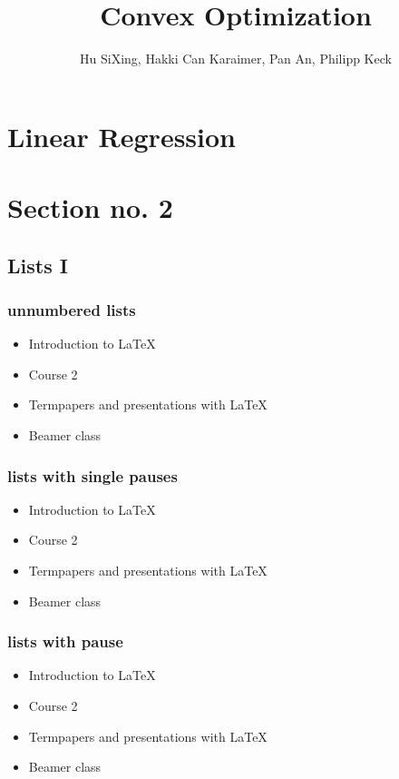 \documentclass[hyperref={pdfpagelabels=false}]{beamer}
\author[\parbox{.2\paperwidth}{}]{Hu SiXing, Hakki Can Karaimer, Pan An, Philipp Keck}
\institute{National University of Singapore}
\title{Convex Optimization}
\newcommand\mynew{andyandyandy}
\begin{document}
\begin{frame}
  \titlepage
\end{frame}


% 


\section{Linear Regression}



\section{Section no. 2}
\subsection{Lists I}
\begin{frame}
  \frametitle{unnumbered lists}
  \begin{itemize}
  \item Introduction to  \LaTeX{}
  \item Course 2
  \item Termpapers and presentations with \LaTeX{}
  \item Beamer class
  \end{itemize}
\end{frame}

\begin{frame}\frametitle{lists with single pauses}
  \begin{itemize}
  \item Introduction to  \LaTeX{}  \pause
  \item Course 2 \pause
  \item Termpapers and presentations with \LaTeX{}  \pause
  \item Beamer class
  \end{itemize}
\end{frame}

\begin{frame}\frametitle{lists with pause}
  \begin{itemize}[<+->]
  \item Introduction to  \LaTeX{}
  \item Course 2
  \item Termpapers and presentations with \LaTeX{}
  \item Beamer class
  \end{itemize}
\end{frame}
\end{document}
